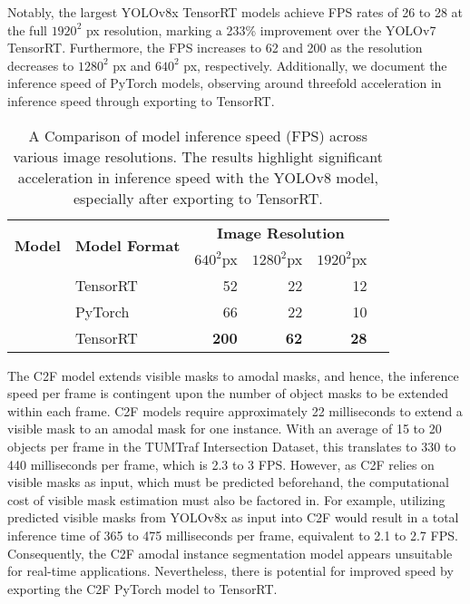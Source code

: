 Notably, the largest YOLOv8x TensorRT models achieve FPS rates of 26 to 28 at the full $1920^2$ px resolution, marking a 233\% improvement over the YOLOv7 TensorRT. Furthermore, the FPS increases to 62 and 200 as the resolution decreases to $1280^2$ px and $640^2$ px, respectively. Additionally, we document the inference speed of PyTorch models, observing around threefold acceleration in inference speed through exporting to TensorRT.

\begin{table}[htb]
	\centering
	\renewcommand{\arraystretch}{1.1} %
    \begin{tabular}{p{60pt}p{80pt}|rrrr}
		\hline
		\multirow{2}{*}{\textbf{Model}} & \multirow{2}{*}{\textbf{Model Format}} & \multicolumn{3}{c}{\textbf{Image Resolution}} & \\
		& & $640^2$px & $1280^2$px & $1920^2$px \\
		\hline
		\code{YOLOv7}  & TensorRT  & 52 & 22 & 12 \\
		\hline
		\code{YOLOv8x}  & PyTorch & 66 & 22 & 10 \\
		\code{YOLOv8x}  & TensorRT & \textbf{200} & \textbf{62} & \textbf{28} \\
		\hline
	\end{tabular}
	\caption{A Comparison of model inference speed (FPS) across various image resolutions. The results highlight significant acceleration in inference speed with the YOLOv8 model, especially after exporting to TensorRT.}
	\label{tab:model_speed_resolutions_combined}
\end{table}

The C2F model extends visible masks to amodal masks, and hence, the inference speed per frame is contingent upon the number of object masks to be extended within each frame. C2F models require approximately 22 milliseconds to extend a visible mask to an amodal mask for one instance. With an average of 15 to 20 objects per frame in the TUMTraf Intersection Dataset, this translates to 330 to 440 milliseconds per frame, which is 2.3 to 3 FPS. However, as C2F relies on visible masks as input, which must be predicted beforehand, the computational cost of visible mask estimation must also be factored in. For example, utilizing predicted visible masks from YOLOv8x as input into C2F would result in a total inference time of 365 to 475 milliseconds per frame, equivalent to 2.1 to 2.7 FPS. Consequently, the C2F amodal instance segmentation model appears unsuitable for real-time applications. Nevertheless, there is potential for improved speed by exporting the C2F PyTorch model to TensorRT.


